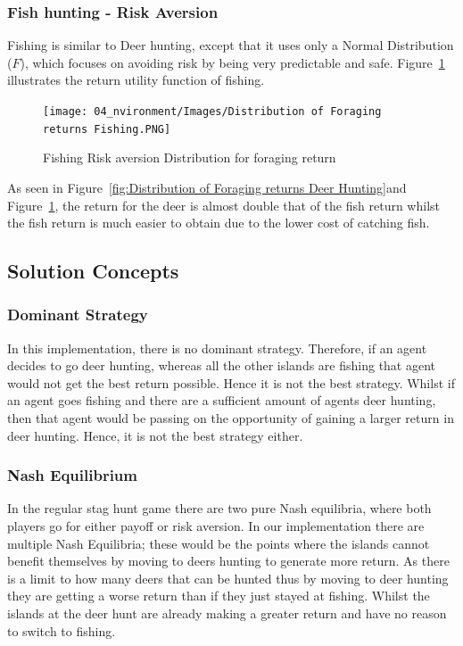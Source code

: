 \newpage
\subsubsection{Fish hunting - Risk Aversion}

Fishing is similar to Deer hunting, except that it uses only a Normal Distribution ($F$), which focuses on avoiding risk by being very predictable and safe. Figure~\ref{fig:Distribution of Foraging returns Fishing} illustrates the return utility function of fishing.

\begin{figure}[!htb]
    \centering
    \texttt{[image: 04\_nvironment/Images/Distribution of Foraging returns Fishing.PNG]}
    \caption{Fishing Risk aversion Distribution for foraging return}
    \label{fig:Distribution of Foraging returns Fishing}
\end{figure}

As seen in Figure~\ref{fig:Distribution of Foraging returns Deer Hunting}and Figure~\ref{fig:Distribution of Foraging returns Fishing}, the return for the deer is almost double that of the fish return whilst the fish return is much easier to obtain due to the lower cost of catching fish.

\newpage
\subsection{Solution Concepts}
\subsubsection{Dominant Strategy}

In this implementation, there is no dominant strategy. Therefore, if an agent decides to go deer hunting, whereas all the other islands are fishing that agent would not get the best return possible. Hence it is not the best strategy. Whilst if an agent goes fishing and there are a sufficient amount of agents deer hunting, then that agent would be passing on the opportunity of gaining a larger return in deer hunting. Hence, it is not the best strategy either.

\subsubsection{Nash Equilibrium}

In the regular stag hunt game there are two pure Nash equilibria, where both players go for either payoff or risk aversion. In our implementation there are multiple Nash Equilibria; these would be the points where the islands cannot benefit themselves by moving to deers hunting to generate more return. As there is a limit to how many deers that can be hunted thus by moving to deer hunting they are getting a worse return than if they just stayed at fishing. Whilst the islands at the deer hunt are already making a greater return and have no reason to switch to fishing.

